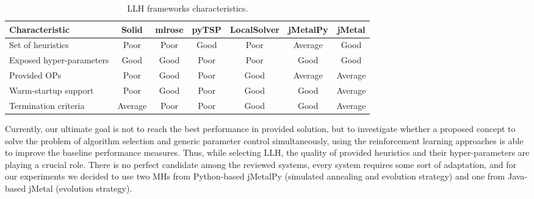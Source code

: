 \begin{table}[h!]
	\centering
	\begin{tabular}{l||cccccc}
		\textbf{Characteristic} & \textbf{Solid} & \textbf{mlrose} & \textbf{pyTSP} & \textbf{LocalSolver} & \textbf{jMetalPy} & \textbf{jMetal} \\
		\hline
		\hline
		Set of heuristics & \cellcolor{red!25}Poor & \cellcolor{red!25}Poor & \cellcolor{green!25}Good & \cellcolor{red!25}Poor & \cellcolor{yellow!25}Average & \cellcolor{green!25}Good \\
		
		Exposed hyper-parameters & \cellcolor{green!25}Good & \cellcolor{green!25}Good & \cellcolor{red!25}Poor & \cellcolor{red!25}Poor & \cellcolor{green!25}Good & \cellcolor{green!25}Good \\
		
		Provided OPs & \cellcolor{red!25}Poor & \cellcolor{green!25}Good & \cellcolor{red!25}Poor & \cellcolor{green!25}Good & \cellcolor{yellow!25}Average & \cellcolor{yellow!25}Average \\
		
		Warm-startup support & \cellcolor{red!25}Poor & \cellcolor{green!25}Good & \cellcolor{red!25}Poor & \cellcolor{green!25}Good & \cellcolor{green!25}Good & \cellcolor{yellow!25}Average \\
		
		Termination criteria & \cellcolor{yellow!25}Average & \cellcolor{red!25}Poor & \cellcolor{red!25}Poor & \cellcolor{green!25}Good & \cellcolor{green!25}Good & \cellcolor{yellow!25}Average \\
	\end{tabular}
	\caption{LLH frameworks characteristics.}
	\label{iml: table llh selection}
\end{table}

Currently, our ultimate goal is not to reach the best performance in provided solution, but to investigate whether a proposed concept to solve the problem of algorithm selection and generic parameter control simultaneously, using the reinforcement learning approaches is able to improve the baseline performance measures. Thus, while selecting LLH, the quality of provided heuristics and their hyper-parameters are playing a crucial role. There is no perfect candidate among the reviewed systems, every system requires some sort of adaptation, and for our experiments we decided to use two MHs from Python-based jMetalPy (simulated annealing and evolution strategy) and one from Java-based jMetal (evolution strategy).


